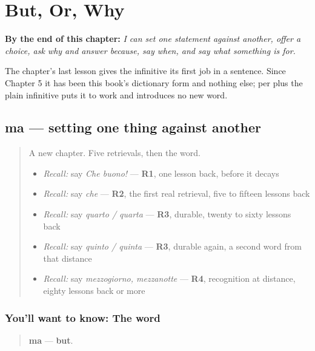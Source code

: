 
\chapter{But, Or, Why}
\label{ch:it-unire}

\begin{chapteropening}
\textbf{By the end of this chapter:} \emph{I can set one statement against another, offer a choice, ask why and answer because, say when, and say what something is for.}

The chapter's last lesson gives the infinitive its first job in a sentence. Since Chapter 5 it has been this book's dictionary form and nothing else; per plus the plain infinitive puts it to work and introduces no new word.
\end{chapteropening}

\section[ma]{ma — setting one thing against another}

\label{lesson:IT-C32-ma}



\begin{quote}
A new chapter. Five retrievals, then the word.

\begin{itemize}
\raggedright
  \item \emph{Recall:} say \emph{Che buono!} — \textbf{R1}, one lesson back, before it decays
  \item \emph{Recall:} say \emph{che} — \textbf{R2}, the first real retrieval, five to fifteen lessons back
  \item \emph{Recall:} say \emph{quarto / quarta} — \textbf{R3}, durable, twenty to sixty lessons back
  \item \emph{Recall:} say \emph{quinto / quinta} — \textbf{R3}, durable again, a second word from that distance
  \item \emph{Recall:} say \emph{mezzogiorno, mezzanotte} — \textbf{R4}, recognition at distance, eighty lessons back or more
\end{itemize}
\end{quote}

\subsection*{You'll want to know: The word}
\begin{quote}
\textbf{ma} — \textbf{but}.
\end{quote}

